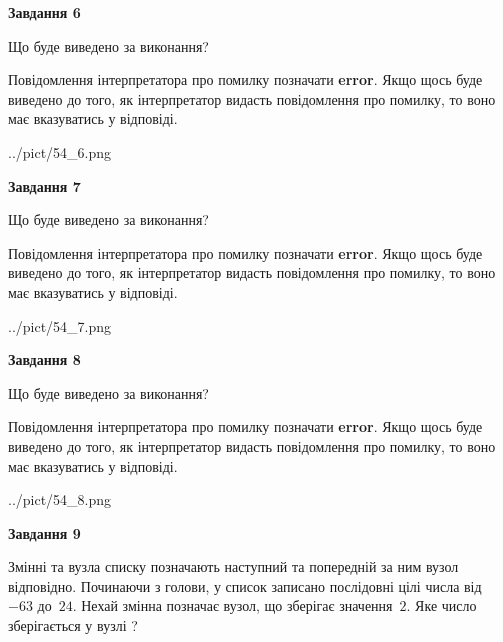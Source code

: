 \documentclass[12pt, ukrainian]{article}
\begin{document}
{\begin {large}
{\begin {center}\textbf{Завдання 6}\end {center}}\par
Що буде виведено за виконання?

Повідомлення інтерпретатора про помилку позначати \textbf{error}.
Якщо щось буде виведено до того, як інтерпретатор видасть повідомлення про помилку, 
то воно має вказуватись у відповіді. \par


\begin{center}
	{../pict/54_6.png}
\end{center}
\newpage

{\begin {center}\textbf{Завдання 7}\end {center}}\par
Що буде виведено за виконання?

Повідомлення інтерпретатора про помилку позначати \textbf{error}.
Якщо щось буде виведено до того, як інтерпретатор видасть повідомлення про помилку, 
то воно має вказуватись у відповіді. \par


\begin{center}
	{../pict/54_7.png}
\end{center}
\newpage

{\begin {center}\textbf{Завдання 8}\end {center}}\par
Що буде виведено за виконання?

Повідомлення інтерпретатора про помилку позначати \textbf{error}.
Якщо щось буде виведено до того, як інтерпретатор видасть повідомлення про помилку, 
то воно має вказуватись у відповіді. \par


\begin{center}
	{../pict/54_8.png}
\end{center}
\newpage

{\begin {center}\textbf{Завдання 9}\end {center}}\par
Змінні  та  вузла списку позначають наступний та попередній за ним вузол відповідно. Починаючи з голови, у список записано послідовні цілі числа від~$-63$ до~$24$. Нехай змінна  позначає вузол, що зберігає значення~$2$.
Яке число зберігається у вузлі  ?\par
\newpage


\end{large}}
\end{document}

